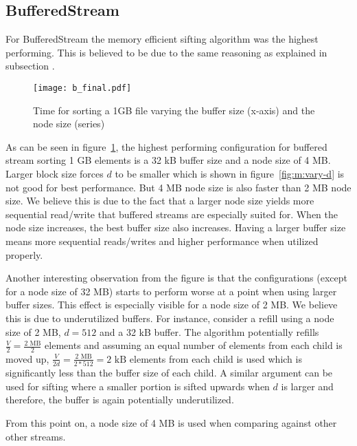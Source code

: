 
\subsection{BufferedStream}

For BufferedStream the memory efficient sifting algorithm was the highest performing. This is believed to be due to the same reasoning as explained in subsection .

\begin{figure}[h!]
  \centering
  \texttt{[image: b\_final.pdf]}
  \caption{Time for sorting a 1GB file varying the buffer size (x-axis) and the node size (series)}
  \label{fig:b_final}
\end{figure}

As can be seen in figure~\ref{fig:b_final}, the highest performing configuration for buffered stream sorting 1 GB elements is a 32 kB buffer size and a node size of 4 MB. Larger block size forces $d$ to be smaller which is shown in figure~\ref{fig:m:vary-d} is not good for best performance. But 4 MB node size is also faster than 2 MB node size. We believe this is due to the fact that a larger node size yields more sequential read/write that buffered streams are especially suited for. When the node size increases, the best buffer size also increases. Having a larger buffer size means more sequential reads/writes and higher performance when utilized properly.

Another interesting observation from the figure is that the configurations (except for a node size of 32 MB) starts to perform worse at a point when using larger buffer sizes. This effect is especially visible for a node size of 2 MB. We believe this is due to underutilized buffers. For instance, consider a refill using a node size of 2 MB, $d=512$ and a 32 kB buffer. The algorithm potentially refills $\frac{V}{2}=\frac{\textrm{2 MB}}{2}$ elements and assuming an equal number of elements from each child is moved up, $\frac{V}{2d}=\frac{\textrm{2 MB}}{2*512}=\textrm{2 kB}$ elements from each child is used which is significantly less than the buffer size of each child. A similar argument can be used for sifting where a smaller portion is sifted upwards when $d$ is larger and therefore, the buffer is again potentially underutilized.


From this point on, a node size of 4 MB is used when comparing against other other streams.

